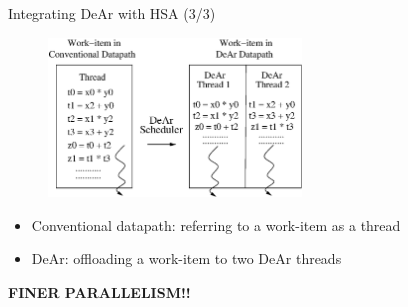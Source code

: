 \documentclass{beamer}
\begin{document}
\begin{CJK}{UTF8}{bkai}
            \begin{frame}{Integrating DeAr with HSA (3/3)}
                        \begin{figure}[!ht]
                            \centering
                                \includegraphics[width=0.6\textwidth]{figs/bb3.eps}
                        \end{figure}
                        \begin{itemize}
                            \pause
                            \item {Conventional datapath: referring to a work-item as a thread}
                            \pause
                            \item {DeAr: offloading a work-item to two DeAr threads}
                        \end{itemize}
                        \pause
                        \begin{center}
                            \large{\textbf{FINER PARALLELISM!!}}
                        \end{center}
            \end{frame}


\end{CJK}
\end{document}
